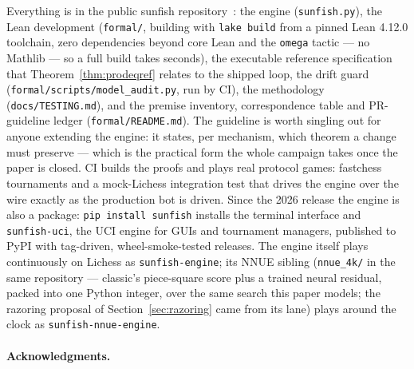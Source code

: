 \documentclass[11pt]{article}
\theoremstyle{plain}
\theoremstyle{definition}
\theoremstyle{remark}
\begin{document}
Everything is in the public sunfish
repository~\cite{sunfish}: the engine (\texttt{sunfish.py}), the Lean
development (\texttt{formal/}, building with \texttt{lake build} from a
pinned Lean 4.12.0 toolchain, zero dependencies beyond core Lean and the
\texttt{omega} tactic --- no Mathlib --- so a full build takes seconds),
the executable reference specification that Theorem~\ref{thm:prodeqref}
relates to the shipped loop, the drift guard
(\texttt{formal/scripts/model\_audit.py}, run by CI), the methodology
(\texttt{docs/TESTING.md}), and the premise inventory, correspondence
table and PR-guideline ledger (\texttt{formal/README.md}).  The
guideline is worth singling out for anyone extending the engine: it
states, per mechanism, which theorem a change must preserve --- which
is the practical form the whole campaign takes once the paper is
closed.  CI builds the proofs and plays real protocol games: fastchess
tournaments and a mock-Lichess integration test that drives the engine
over the wire exactly as the production bot is driven.  Since the 2026
release the engine is also a package: \texttt{pip install sunfish}
installs the terminal interface and \texttt{sunfish-uci}, the UCI
engine for GUIs and tournament managers, published to PyPI with
tag-driven, wheel-smoke-tested releases.  The engine
itself plays continuously on Lichess as \texttt{sunfish-engine}; its
NNUE sibling (\texttt{nnue\_4k/} in the same repository --- classic's
piece-square score plus a trained neural residual, packed into one
Python integer, over the same search this paper models; the razoring
proposal of Section~\ref{sec:razoring} came from its lane) plays
around the clock as \texttt{sunfish-nnue-engine}.

\paragraph{Acknowledgments.}


\end{document}
